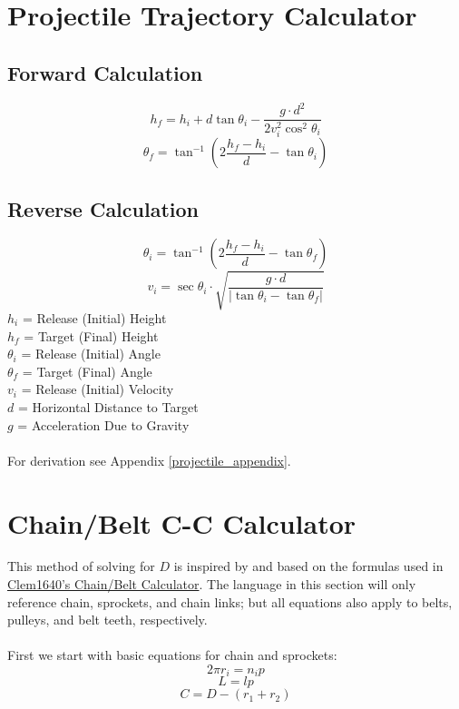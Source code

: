 \documentclass[11pt,a4paper,titlepage]{article}
\begin{document}
	\newpage
	\section{Projectile Trajectory Calculator}
	\subsection{Forward Calculation}
	\begin{equation} \label{proj_final_height}
		h_f = h_i + d \tan \theta_i - \frac{g \cdot d^2}{2 v_i^2 \cos^2 \theta_i}
	\end{equation}
	\begin{equation} \label{proj_final_angle}
		\theta_f = \tan^{-1} \left( 2 \frac{h_f - h_i}{d} - \tan \theta_i \right)
	\end{equation}
	
	\subsection{Reverse Calculation}
	\begin{equation} \label{proj_init_angle}
		\theta_i = \tan^{-1} \left( 2 \frac{h_f - h_i}{d} - \tan \theta_f \right)
	\end{equation}
	\begin{equation} \label{proj_init_vel}
		v_i = \sec \theta_i \cdot \sqrt{\frac{g \cdot d}{\left| \tan \theta_i - \tan \theta_f \right|}}
	\end{equation}
	$h_i$ = Release (Initial) Height \\
	$h_f$ = Target (Final) Height \\
	$\theta_i$ = Release (Initial) Angle \\
	$\theta_f$ = Target (Final) Angle \\
	$v_i$ = Release	(Initial) Velocity \\
	$d$ = Horizontal Distance to Target \\
	$g$ = Acceleration Due to Gravity\\ \\
	For derivation see Appendix \ref{projectile_appendix}.
	
	\bigskip
	\section{Chain/Belt C-C Calculator}
	This method of solving for $D$ is inspired by and based on the formulas used in \href{https://www.chiefdelphi.com/t/paper-chain-belt-calculator/168971}{Clem1640's Chain/Belt Calculator}. The language in this section will only reference chain, sprockets, and chain links; but all equations also apply to belts, pulleys, and belt teeth, respectively. \\ \\		
	First we start with basic equations for chain and sprockets:
	\begin{equation}
		2 \pi r_i = n_i p
	\end{equation}
	\begin{equation}
		L = l p
	\end{equation}
	\begin{equation}
		C = D - (r_1 + r_2)
	\end{equation}
	
\end{document}
